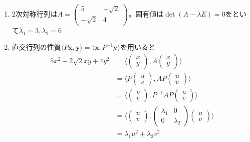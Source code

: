 \documentclass[dvipdfmx,a4j,10pt]{jsarticle}
\makeatletter
\theoremstyle{mystyle1}
\theoremstyle{mystyle2}
\newtheorem{ans}{解答}
\renewenvironment{ans}[1][解答]{\par
  \pushQED{\qed}%
  \normalfont
  \topsep6\p@\@plus6\p@ \trivlist
  \item[\hskip\labelsep{\bfseries\sffamily #1}]\ignorespaces
}{%
  \popQED\endtrivlist\@endpefalse
}
\makeatother
\begin{document}
\newpage

\begin{ans}\
    \begin{enumerate}\renewcommand{\labelenumi}{(\arabic{enumi})}
        \item 2次対称行列は$A=\begin{pmatrix} 5 & -\sqrt{2} \\ -\sqrt{2} & 4 \end{pmatrix}$。固有値は$\det(A-\lambda E)=0$をといて$\lambda_1=3,\lambda_2=6$
        \item 直交行列の性質$\langle P\bm{x},\bm{y}\rangle=\langle \bm{x},P^{-1}\bm{y}\rangle$を用いると
        \[
        \begin{split}
            5x^2-2\sqrt{2}xy+4y^2
            &=\langle \begin{pmatrix} x \\ y \end{pmatrix},A\begin{pmatrix} x \\ y \end{pmatrix} \rangle\\
            &=\langle P\begin{pmatrix} u \\ v \end{pmatrix},AP\begin{pmatrix} u \\ v \end{pmatrix} \rangle\\
            &=\langle \begin{pmatrix} u \\ v \end{pmatrix},P^{-1}AP\begin{pmatrix} u \\ v \end{pmatrix} \rangle\\
            &=\langle \begin{pmatrix} u \\ v \end{pmatrix},\begin{pmatrix} \lambda_1 & 0 \\ 0 & \lambda_2 \end{pmatrix} \begin{pmatrix} u \\ v \end{pmatrix} \rangle\\
            &=\lambda_1 u^2+\lambda_2 v^2
        \end{split}
\]
\end{enumerate}
\end{ans}
\end{document}
